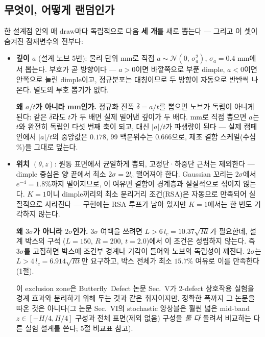 \documentclass[11pt]{article}
\begin{document}
\subsection{무엇이, 어떻게 랜덤인가}

한 설계점 안의 매 draw마다 독립적으로 다음 \textbf{세 개}를 새로 뽑는다 ---
그리고 이 셋이 숨겨진 잠재변수의 전부다:

\begin{itemize}
\item \textbf{깊이 $a$} (설계 노브 5번): 물리 단위 mm로 직접
      $a \sim \mathcal{N}(0,\,\sigma_a^2)$, $\sigma_a = 0.4$ mm에서 뽑는다.
      부호가 곧 방향이다 --- $a>0$이면 바깥쪽으로 부푼 dimple, $a<0$이면
      안쪽으로 눌린 dimple이고, 정규분포는 대칭이므로 두 방향이 자동으로
      반반씩 나온다. 별도의 부호 뽑기가 없다.

      \textbf{왜 $a/t$가 아니라 mm인가.} 정규화 진폭 $\bar\delta = a/t$를
      뽑으면 노브가 독립이 아니게 된다: 같은 $\bar\delta$라도 $t$가 두 배면
      실제 밀어낸 깊이가 두 배다. mm로 직접 뽑으면 $a$는 $t$와 완전히 독립인
      다섯 번째 축이 되고, 대신 $|a|/t$가 파생량이 된다 --- 실제 캠페인에서
      $|a|/t$의 중앙값은 $0.178$, 99 백분위수는 $0.666$으로, 제조 결함
      스케일(수십 \%)을 그대로 덮는다.

\item \textbf{위치 $(\theta, z)$}: 원통 표면에서 균일하게 뽑되, 고정단·하중단
      근처는 제외한다 --- dimple 중심은 양 끝에서 최소 $2\sigma = 2l_c$ 떨어져야
      한다. Gaussian 꼬리는 $2\sigma$에서 $e^{-4} = 1.8\%$까지 떨어지므로, 이
      여유면 결함이 경계층과 실질적으로 섞이지 않는다. $K{=}1$이니 dimple끼리의
      최소 분리거리 조건(RSA)은 자동으로 만족되어 실질적으로 사라진다 ---
      구현에는 RSA 루프가 남아 있지만 $K{=}1$에서는 한 번도 기각하지 않는다.

      \textbf{왜 $3\sigma$가 아니라 $2\sigma$인가.} $3\sigma$ 여백을 쓰려면
      $L > 6\,l_c = 10.37\sqrt{Rt}$가 필요한데, 설계 박스의 구석
      ($L{=}150$, $R{=}200$, $t{=}2.0$)에서 이 조건은 성립하지 않는다. 즉
      $3\sigma$를 고집하면 박스에 조건부 경계나 기각이 들어와 노브의 독립성이
      깨진다. $2\sigma$는 $L > 4\,l_c = 6.914\sqrt{Rt}$만 요구하고, 박스 전체가
      최소 $15.7\%$ 여유로 이를 만족한다(1절).

      이 exclusion zone은 Butterfly~Defect 논문 Sec.~V가 2-defect 상호작용
      실험을 경계 효과와 분리하기 위해 두는 것과 같은 취지이지만, 정확한 폭까지
      그 논문을 따온 것은 아니다(그 논문 Sec.~VI의 stochastic 앙상블은 훨씬 넓은
      mid-band $z\in[-H/4,H/4]$ 구성과 전체 표면(제외 없음) 구성을 \emph{둘 다}
      돌려서 비교하는 다른 실험 설계를 쓴다; 5절 비교표 참고).
\end{itemize}
\end{document}
